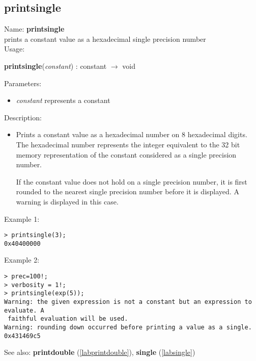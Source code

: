 \subsection{printsingle}
\label{labprintsingle}
\noindent Name: \textbf{printsingle}\\
prints a constant value as a hexadecimal single precision number\\
\noindent Usage: 
\begin{center}
\textbf{printsingle}(\emph{constant}) : \textsf{constant} $\rightarrow$ \textsf{void}\\
\end{center}
Parameters: 
\begin{itemize}
\item \emph{constant} represents a constant
\end{itemize}
\noindent Description: \begin{itemize}

\item Prints a constant value as a hexadecimal number on 8 hexadecimal
   digits. The hexadecimal number represents the integer equivalent to
   the 32 bit memory representation of the constant considered as a
   single precision number.
    
   If the constant value does not hold on a single precision number, it
   is first rounded to the nearest single precision number before it is
   displayed. A warning is displayed in this case.
\end{itemize}
\noindent Example 1: 
\begin{center}\begin{minipage}{15cm}\begin{Verbatim}[frame=single]
> printsingle(3);
0x40400000
\end{Verbatim}
\end{minipage}\end{center}
\noindent Example 2: 
\begin{center}\begin{minipage}{15cm}\begin{Verbatim}[frame=single]
> prec=100!;
> verbosity = 1!;
> printsingle(exp(5));
Warning: the given expression is not a constant but an expression to evaluate. A
 faithful evaluation will be used.
Warning: rounding down occurred before printing a value as a single.
0x431469c5
\end{Verbatim}
\end{minipage}\end{center}
See also: \textbf{printdouble} (\ref{labprintdouble}), \textbf{single} (\ref{labsingle})

